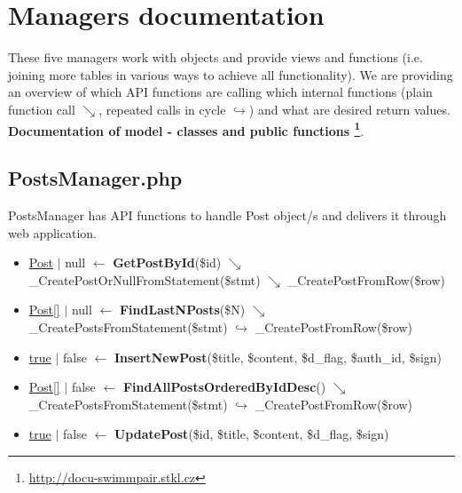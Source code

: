 \section{Managers documentation}
\par These five managers work with objects and provide views and functions (i.e. joining more tables in various ways to achieve all functionality). We are providing an overview of which API functions are calling which internal functions (plain function call $\searrow$, repeated calls in cycle $\hookrightarrow$) and what are desired return values.  
\newline
\textbf{Documentation of model - classes and public functions \footnote{\url{http://docu-swimmpair.stkl.cz}}}.

\subsection{PostsManager.php}
PostsManager has API functions to handle Post object/s and delivers it through web application.
\begin{itemize}
  \setlength\itemsep{0em}
  \item \underline{Post} $\vert$ null $\leftarrow$ \textbf{GetPostById}(\$id)
  \newline    $\searrow$ \_CreatePostOrNullFromStatement(\$stmt)
  \newline    $\searrow$ \_CreatePostFromRow(\$row)
  \item \underline{Post[]} $\vert$ null $\leftarrow$ \textbf{FindLastNPosts}(\$N)
  \newline    $\searrow$ \_CreatePostsFromStatement(\$stmt)
  \newline    $\hookrightarrow$ \_CreatePostFromRow(\$row)
  \item \underline{true} $\vert$ false $\leftarrow$ \textbf{InsertNewPost}(\$title, \$content, \$d\_flag, \$auth\_id, \$sign)
  \item \underline{Post[]} $\vert$ false $\leftarrow$ \textbf{FindAllPostsOrderedByIdDesc}()
  \newline    $\searrow$ \_CreatePostsFromStatement(\$stmt)
  \newline    $\hookrightarrow$ \_CreatePostFromRow(\$row)
  \item \underline{true} $\vert$ false $\leftarrow$ \textbf{UpdatePost}(\$id, \$title, \$content, \$d\_flag, \$sign)
\end{itemize}

